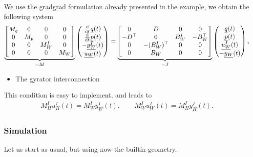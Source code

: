 \documentclass[letterpaper,10pt,english]{sphinxmanual}
\begin{document}
\sphinxAtStartPar
We use the grad\sphinxhyphen{}grad formulation already presented in the 
example,  we obtain the following system
\begin{equation*}
\begin{split}\underbrace{\begin{bmatrix}
M_q & 0 & 0 & 0 \\
0 & M_p & 0 & 0 \\
0 & 0 & M^I_W & 0 \\
0 & 0 & 0 & M_W
\end{bmatrix}}_{= M}
\begin{pmatrix}
\frac{\rm d}{{\rm d}t} \underline{q}(t) \\
\frac{\rm d}{{\rm d}t} \underline{p}(t) \\
-\underline{y^I_W}(t) \\
\underline{u_W}(t)
\end{pmatrix}
=
\underbrace{\begin{bmatrix}
0 & D & 0 & 0 \\
-D^\top & 0 & B^I_W & -B_W^\top \\
0 & -(B^I_W)^\top & 0 & 0 \\
0 & B_W & 0 & 0
\end{bmatrix}}_{= J}
\begin{pmatrix}
\underline{q}(t) \\
\underline{p}(t) \\
\underline{u^I_W}(t) \\
-\underline{y_W}(t)
\end{pmatrix},\end{split}
\end{equation*}\begin{itemize}
\item {} 
\sphinxAtStartPar
The gyrator interconnection

\end{itemize}

\sphinxAtStartPar
This condition is easy to implement, and leads to
\begin{equation*}
\begin{split}M^I_H \underline{u^I_H}(t) = M^I_W \underline{y^I_W}(t), \qquad M^I_W \underline{u^I_W}(t) = M^I_H \underline{y^I_H}(t).\end{split}
\end{equation*}

\subsubsection{Simulation}
\label{\detokenize{examples/heat_wave:simulation}}
\sphinxAtStartPar
Let us start as usual, but using now the  built\sphinxhyphen{}in
geometry.
\end{document}
